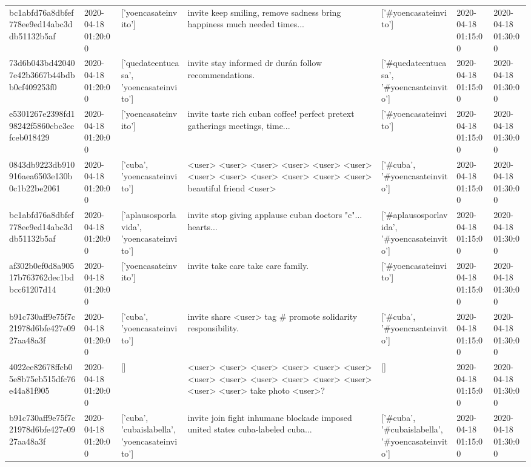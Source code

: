 \begin{tabular}{lllllll}
bc1abfd76a8dbfef778ee9ed14abc3ddb51132b5af & 2020-04-18 01:20:00 & ['yoencasateinvito'] & invite keep smiling, remove sadness bring happiness much needed times... & ['#yoencasateinvito'] & 2020-04-18 01:15:00 & 2020-04-18 01:30:00 \\
73d6b043bd420407e42b3667b44bdbb0cf409253f0 & 2020-04-18 01:20:00 & ['quedateentucasa', 'yoencasateinvito'] & invite stay informed dr durán follow recommendations. & ['#quedateentucasa', '#yoencasateinvito'] & 2020-04-18 01:15:00 & 2020-04-18 01:30:00 \\
e5301267e2398fd198242f5860cbc3ecfceb018429 & 2020-04-18 01:20:00 & ['yoencasateinvito'] & invite taste rich cuban coffee! perfect pretext gatherings meetings, time... & ['#yoencasateinvito'] & 2020-04-18 01:15:00 & 2020-04-18 01:30:00 \\
0843db9223db910916aea6503e130b0c1b22be2061 & 2020-04-18 01:20:00 & ['cuba', 'yoencasateinvito'] & <user> <user> <user> <user> <user> <user> <user> <user> <user> <user> <user> <user> beautiful friend <user> & ['#cuba', '#yoencasateinvito'] & 2020-04-18 01:15:00 & 2020-04-18 01:30:00 \\
bc1abfd76a8dbfef778ee9ed14abc3ddb51132b5af & 2020-04-18 01:20:00 & ['aplausosporlavida', 'yoencasateinvito'] & invite stop giving applause cuban doctors "c"... hearts... & ['#aplausosporlavida', '#yoencasateinvito'] & 2020-04-18 01:15:00 & 2020-04-18 01:30:00 \\
af302b0ef0d8a90517b763762dec1bdbcc61207d14 & 2020-04-18 01:20:00 & ['yoencasateinvito'] & invite take care take care family. & ['#yoencasateinvito'] & 2020-04-18 01:15:00 & 2020-04-18 01:30:00 \\
b91c730aff9e75f7c21978d6bfe427e0927aa48a3f & 2020-04-18 01:20:00 & ['cuba', 'yoencasateinvito'] & invite share <user> tag \# promote solidarity responsibility. & ['#cuba', '#yoencasateinvito'] & 2020-04-18 01:15:00 & 2020-04-18 01:30:00 \\
4022ee82678ffcb05e8b75eb515dfc76e44a81f905 & 2020-04-18 01:20:00 & [] & <user> <user> <user> <user> <user> <user> <user> <user> <user> <user> <user> <user> <user> <user> take photo <user>? & [] & 2020-04-18 01:15:00 & 2020-04-18 01:30:00 \\
b91c730aff9e75f7c21978d6bfe427e0927aa48a3f & 2020-04-18 01:20:00 & ['cuba', 'cubaislabella', 'yoencasateinvito'] & invite join fight inhumane blockade imposed united states cuba-labeled cuba... & ['#cuba', '#cubaislabella', '#yoencasateinvito'] & 2020-04-18 01:15:00 & 2020-04-18 01:30:00 \\

\end{tabular}
